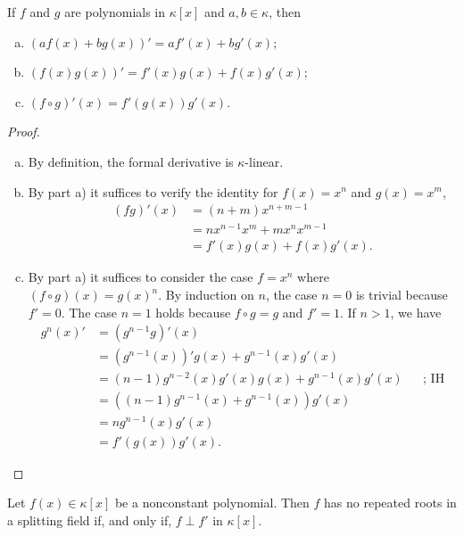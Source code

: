 \begin{prop}
    If\/ $f$ and\/ $g$ are polynomials in $\kappa[x]$ and $a,b\in\kappa$, then
    \begin{enumerate}[a), font=\upshape]
        \item $(af(x) + bg(x))' = af'(x) + bg'(x)$;
        \item $(f(x)g(x))' = f'(x)g(x) + f(x)g'(x)$;
        \item $(f\circ g)'(x) = f'(g(x))g'(x)$.
    \end{enumerate}
\end{prop}

\begin{proof}${}$
    \begin{enumerate}[a), font=\upshape]
        \item By definition, the formal derivative is $\kappa$-linear.
        \item By part a) it suffices to verify the identity for $f(x)=x^n$ and $g(x)=x^m$,
        \begin{align*}
            (fg)'(x) &= (n+m)x^{n+m-1}\\
                &= nx^{n-1}x^m+mx^nx^{m-1}\\
                &= f'(x)g(x)+f(x)g'(x).
        \end{align*}
        \normalsize
        
        \item By part a) it suffices to consider the case $f=x^n$ where $(f\circ g)(x)=g(x)^n$. By induction on $n$, the case $n=0$ is trivial because $f'=0$. The case $n=1$ holds because $f\circ g=g$ and $f'=1$. If $n>1$, we have
        \begin{align*}
            g^n(x)' &= (g^{n-1}g)'(x)\\
                &= (g^{n-1}(x))'g(x)+g^{n-1}(x)g'(x)\\
                &= (n-1)g^{n-2}(x)g'(x)g(x) + g^{n-1}(x)g'(x)
                    &&\text{; IH}\\
                &= ((n-1)g^{n-1}(x)+g^{n-1}(x))g'(x)\\
                &= ng^{n-1}(x)g'(x)\\
                &= f'(g(x))g'(x).
        \end{align*}
        \normalsize
    \end{enumerate}
\end{proof}

\begin{prop}\label{prop:f-perp-f'}
    Let\/ $f(x) \in\kappa[x]$ be a nonconstant polynomial. Then\/ $f$ has no repeated roots in a splitting field if, and only if, $f\perp f'$ in\/ $\kappa[x]$.
\end{prop}

